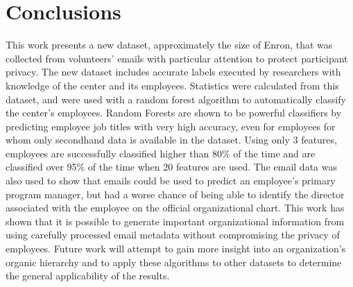 \documentclass[12pt]{report}
\begin{document}
\chapter{Conclusions} \label{Conclusions}
This work presents a new dataset, approximately the size of Enron, that was collected from volunteers' emails with particular attention to protect participant privacy.
The new dataset includes accurate labels executed by researchers with knowledge of the center and its employees.
Statistics were calculated from this dataset, and were used with a random forest algorithm to automatically classify the center's employees.
Random Forests are shown to be powerful classifiers by predicting employee job titles with very high accuracy, even for employees for whom only secondhand data is available in the dataset.
Using only 3 features, employees are successfully classified higher than 80\% of the time and are classified over 95\% of the time when 20 features are used.
The email data was also used to show that emails could be used to predict an employee's primary program manager, but had a worse chance of being able to identify the director associated with the employee on the official organizational chart.
This work has shown that it is possible to generate important organizational information from using carefully processed email metadata without compromising the privacy of employees.
Future work will attempt to gain more insight into an organization's organic hierarchy and to apply these algorithms to other datasets to determine the general applicability of the results.




%
%

%







\end{document}
